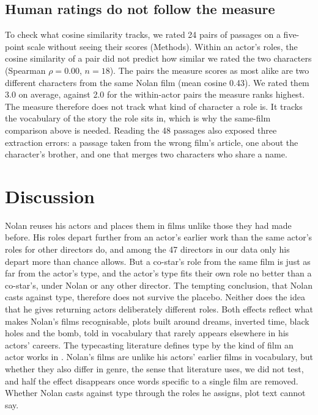 \documentclass[9pt,twocolumn,twoside]{pnas-new}
\begin{document}
\subsection*{Human ratings do not follow the measure}
To check what cosine similarity tracks, we rated 24 pairs of passages on a five-point scale without seeing their scores (Methods). Within an actor's roles, the cosine similarity of a pair did not predict how similar we rated the two characters (Spearman $\rho = 0.00$, $n = 18$). The pairs the measure scores as most alike are two different characters from the same Nolan film (mean cosine 0.43). We rated them 3.0 on average, against 2.0 for the within-actor pairs the measure ranks highest. The measure therefore does not track what kind of character a role is. It tracks the vocabulary of the story the role sits in, which is why the same-film comparison above is needed. Reading the 48 passages also exposed three extraction errors: a passage taken from the wrong film's article, one about the character's brother, and one that merges two characters who share a name.

\section*{Discussion}
Nolan reuses his actors and places them in films unlike those they had made before. His roles depart further from an actor's earlier work than the same actor's roles for other directors do, and among the 47 directors in our data only his depart more than chance allows. But a co-star's role from the same film is just as far from the actor's type, and the actor's type fits their own role no better than a co-star's, under Nolan or any other director. The tempting conclusion, that Nolan casts against type, therefore does not survive the placebo. Neither does the idea that he gives returning actors deliberately different roles. Both effects reflect what makes Nolan's films recognisable, plots built around dreams, inverted time, black holes and the bomb, told in vocabulary that rarely appears elsewhere in his actors' careers. The typecasting literature defines type by the kind of film an actor works in \cite{article_typecast}. Nolan's films are unlike his actors' earlier films in vocabulary, but whether they also differ in genre, the sense that literature uses, we did not test, and half the effect disappears once words specific to a single film are removed. Whether Nolan casts against type through the roles he assigns, plot text cannot say.
\end{document}
